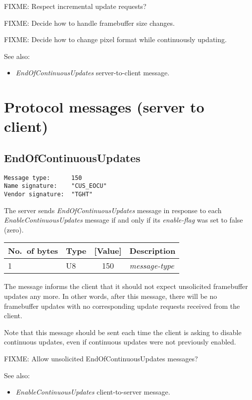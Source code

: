 \documentclass[a4paper]{article}
\newcommand{\typestr}[1]{\textit{#1}}
\begin{document}
FIXME: Respect incremental update requests?

FIXME: Decide how to handle framebuffer size changes.

FIXME: Decide how to change pixel format while continuously updating.

See also:
\begin{itemize}
\item \typestr{EndOfContinuousUpdates} server-to-client message.
\end{itemize}

\newpage
\section{Protocol messages (server to client)}

\subsection{EndOfContinuousUpdates}
\begin{verbatim}
Message type:      150
Name signature:    "CUS_EOCU"
Vendor signature:  "TGHT"
\end{verbatim}

The server sends \typestr{EndOfContinuousUpdates} message in response
to each \typestr{EnableContinuousUpdates} message if and only if its
\typestr{enable-flag} was set to false (zero).

\begin{tabular}{l|lc|l} \hline
No.\ of bytes & Type & [Value] & Description \\ \hline
1 & U8  & 150 & \typestr{message-type} \\
\hline\end{tabular}

The message informs the client that it should not expect unsolicited
framebuffer updates any more. In other words, after this message,
there will be no framebuffer updates with no corresponding update
requests received from the client.

Note that this message should be sent each time the client is asking
to disable continuous updates, even if continuous updates were not
previously enabled.

FIXME: Allow unsolicited EndOfContinuousUpdates messages?

See also:
\begin{itemize}
\item \typestr{EnableContinuousUpdates} client-to-server message.
\end{itemize}
\end{document}
